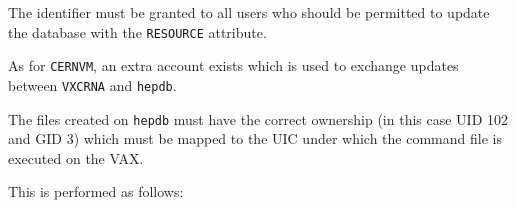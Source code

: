 The identifier must be granted to all users who should be permitted
to update the database with the {\tt RESOURCE} attribute.

As for {\tt CERNVM}, an extra account exists which is used to
exchange updates between {\tt VXCRNA} and {\tt hepdb}.

The files created on {\tt hepdb} must have the correct ownership
(in this case UID 102 and GID 3) which must be mapped to the UIC
under which the command file is executed on the VAX.

This is performed as follows:


